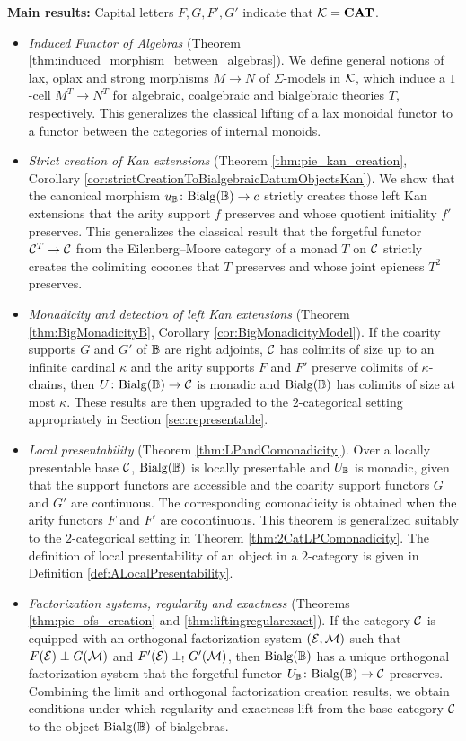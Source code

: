 \smallskip
\noindent\textbf{Main results:} Capital letters $F,G,F',G'$ indicate that $\mathcal{K} = \mathbf{CAT}$.
\begin{itemize}
    \item \textit{Induced Functor of Algebras} (Theorem \ref{thm:induced_morphism_between_algebras}). We define general notions of lax, oplax and strong morphisms $M\to N$ of $\Sigma$-models in $\mathcal{K}$, which induce a $1$-cell $M^T\to N^T$ for algebraic, coalgebraic and bialgebraic theories $T$, respectively. This generalizes the classical lifting of a lax monoidal functor to a functor between the categories of internal monoids.
    
    \item \textit{Strict creation of Kan extensions} (Theorem \ref{thm:pie_kan_creation}, Corollary \ref{cor:strictCreationToBialgebraicDatumObjectsKan}). We show that the canonical morphism $u_{\mathbb{B}}\colon \mathrm{Bialg}(\mathbb{B})\to c$ strictly creates those left Kan extensions that the arity support $f$ preserves and whose quotient initiality $f'$ preserves. This generalizes the classical result that the forgetful functor $\mathcal{C}^T\to \mathcal{C}$ from the Eilenberg--Moore category of a monad $T$ on $\mathcal{C}$ strictly creates the colimiting cocones that $T$ preserves and whose joint epicness $T^2$ preserves.

    \item \textit{Monadicity and detection of left Kan extensions} (Theorem \ref{thm:BigMonadicityB}, Corollary \ref{cor:BigMonadicityModel}). If the coarity supports $G$ and $G'$ of $\mathbb{B}$ are right adjoints, $\mathcal{C}$ has colimits of size up to an infinite cardinal $\kappa$ and the arity supports $F$ and $F'$ preserve colimits of $\kappa$-chains, then $U\colon \mathrm{Bialg}(\mathbb{B})\to \mathcal{C}$ is monadic and $\mathrm{Bialg}(\mathbb{B})$ has colimits of size at most $\kappa$. These results are then upgraded to the $2$-categorical setting appropriately in Section \ref{sec:representable}.

    \item \textit{Local presentability} (Theorem \ref{thm:LPandComonadicity}). Over a locally presentable base $\mathcal{C}$, $\mathrm{Bialg}(\mathbb{B})$ is locally presentable and $U_{\mathbb{B}}$ is monadic, given that the support functors are accessible and the coarity support functors $G$ and $G'$ are continuous. The corresponding comonadicity is obtained when the arity functors $F$ and $F'$ are cocontinuous. This theorem is generalized suitably to the $2$-categorical setting in Theorem \ref{thm:2CatLPComonadicity}. The definition of local presentability of an object in a $2$-category is given in Definition \ref{def:ALocalPresentability}.

    \item \textit{Factorization systems, regularity and exactness} (Theorems \ref{thm:pie_ofs_creation} and \ref{thm:liftingregularexact}). If the category $\mathcal{C}$ is equipped with an orthogonal factorization system $(\mathcal{E},\mathcal{M})$ such that $F(\mathcal{E})\perp G(\mathcal{M})$ and $F'(\mathcal{E})\perp_! G'(\mathcal{M})$, then $\mathrm{Bialg}(\mathbb{B})$ has a unique orthogonal factorization system that the forgetful functor $U_{\mathbb{B}}\colon \mathrm{Bialg}(\mathbb{B})\to \mathcal{C}$ preserves. Combining the limit and orthogonal factorization creation results, we obtain conditions under which regularity and exactness lift from the base category $\mathcal{C}$ to the object $\mathrm{Bialg}(\mathbb{B})$ of bialgebras.
\end{itemize}

